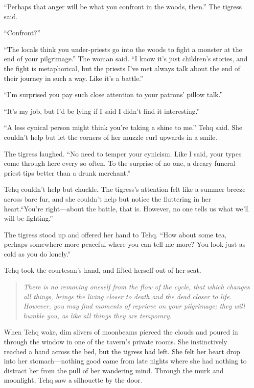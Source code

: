 ``Perhaps that anger will be what you confront in the woods, then.'' The tigress said.

``Confront?''

``The locals think you under-priests go into the woods to fight a monster at the end of your pilgrimage.'' The woman said. ``I know it's just children's stories, and the fight is metaphorical, but the priests I've met always talk about the end of their journey in such a way. Like it's a battle.''

``I'm surprised you pay such close attention to your patrons' pillow talk.''

``It's my job, but I'd be lying if I said I didn't find it interesting.''

``A less cynical person might think you're taking a shine to me.'' Tehq said. She couldn't help but let the corners of her muzzle curl upwards in a smile.

The tigress laughed. ``No need to temper your cynicism. Like I said, your types come through here every so often. To the surprise of no one, a dreary funeral priest tips better than a drunk merchant.''

Tehq couldn't help but chuckle. The tigress's attention felt like a summer breeze across bare fur, and she couldn't help but notice the fluttering in her heart.``You're right---about the battle, that is. However, no one tells us what we'll will be fighting.''

The tigress stood up and offered her hand to Tehq. ``How about some tea, perhaps somewhere more peaceful where you can tell me more? You look just as cold as you do lonely.''

Tehq took the courtesan's hand, and lifted herself out of her seat.

\begin{quote}
\emph{There is no removing oneself from the flow of the cycle, that which changes all things, brings the living closer to death and the dead closer to life. However, you may find moments of reprieve on your pilgrimage; they will humble you, as like all things they are temporary.}
\end{quote}

When Tehq woke, dim slivers of moonbeams pierced the clouds and poured in through the window in one of the tavern's private rooms. She instinctively reached a hand across the bed, but the tigress had left. She felt her heart drop into her stomach---nothing good came from late nights where she had nothing to distract her from the pull of her wandering mind. Through the murk and moonlight, Tehq saw a silhouette by the door.

